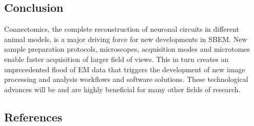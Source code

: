 \documentclass{article}
\begin{document}
\subsection*{Conclusion}

Connectomics, the complete reconstruction of neuronal circuits in different animal models, is a major driving force for new developments in SBEM. New sample preparation protocols, microscopes, acquisition modes and microtomes enable faster acquisition of larger field of views. This in turn creates an unprecedented flood of EM data that triggers the development of new image processing and analysis workflows and software solutions. These technological advances will be and are highly beneficial for many other fields of research.

\subsection*{References}
\end{document}
